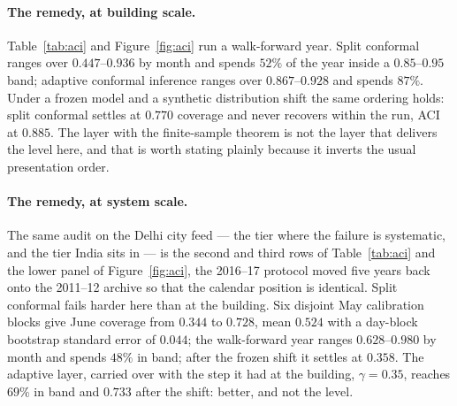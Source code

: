

\paragraph{The remedy, at building scale.} Table~\ref{tab:aci} and
Figure~\ref{fig:aci} run a walk-forward year. Split conformal ranges over
$0.447$--$0.936$ by month and spends $52\%$ of the year inside a
$0.85$--$0.95$ band; adaptive conformal inference \citep{gibbs2021adaptive}
ranges over $0.867$--$0.928$ and spends $87\%$. Under a frozen model and a
synthetic distribution shift the same ordering holds: split conformal settles at
$0.770$ coverage and never recovers within the run, ACI at $0.885$. The layer
with the finite-sample theorem is not the layer that delivers the level here,
and that is worth stating plainly because it inverts the usual presentation
order.



\paragraph{The remedy, at system scale.} The same audit on the Delhi city feed
--- the tier where the failure is systematic, and the tier India sits in --- is
the second and third rows of Table~\ref{tab:aci} and the lower panel of
Figure~\ref{fig:aci}, the 2016--17 protocol moved five years back onto the
2011--12 archive so that the calendar position is identical. Split conformal
fails harder here than at the building. Six disjoint May calibration blocks
give June coverage from $0.344$ to $0.728$, mean $0.524$ with a day-block
bootstrap standard error of $0.044$; the walk-forward year ranges
$0.628$--$0.980$ by month and spends $48\%$ in band; after the frozen shift it
settles at $0.358$. The adaptive layer, carried over with the step it had at
the building, $\gamma=0.35$, reaches $69\%$ in band and $0.733$ after the
shift: better, and not the level.

